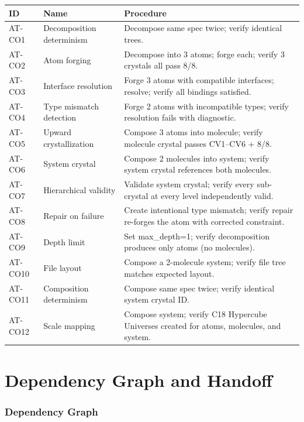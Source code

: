 \documentclass[11pt,a4paper,twoside]{article}
\theoremstyle{definition}
\theoremstyle{plain}
\theoremstyle{remark}
\begin{document}
\begin{longtable}{l l p{6.5cm}}
\toprule
\textbf{ID} & \textbf{Name} & \textbf{Procedure} \\
\midrule
\endfirsthead \midrule \endhead \bottomrule \endfoot
AT-CO1 & Decomposition determinism & Decompose same spec twice; verify
  identical trees. \\
AT-CO2 & Atom forging & Decompose into 3 atoms; forge each; verify
  3 crystals all pass 8/8. \\
AT-CO3 & Interface resolution & Forge 3 atoms with compatible
  interfaces; resolve; verify all bindings satisfied. \\
AT-CO4 & Type mismatch detection & Forge 2 atoms with incompatible
  types; verify resolution fails with diagnostic. \\
AT-CO5 & Upward crystallization & Compose 3 atoms into molecule;
  verify molecule crystal passes CV1--CV6 + 8/8. \\
AT-CO6 & System crystal & Compose 2 molecules into system; verify
  system crystal references both molecules. \\
AT-CO7 & Hierarchical validity & Validate system crystal; verify
  every sub-crystal at every level independently valid. \\
AT-CO8 & Repair on failure & Create intentional type mismatch;
  verify repair re-forges the atom with corrected constraint. \\
AT-CO9 & Depth limit & Set max\_depth=1; verify decomposition
  produces only atoms (no molecules). \\
AT-CO10 & File layout & Compose a 2-molecule system; verify file
  tree matches expected layout. \\
AT-CO11 & Composition determinism & Compose same spec twice; verify
  identical system crystal ID. \\
AT-CO12 & Scale mapping & Compose system; verify C18 Hypercube
  Universes created for atoms, molecules, and system. \\
\end{longtable}


\part{Dependency Graph and Handoff}\label{part:handoff}

\section{Dependency Graph}
\end{document}
